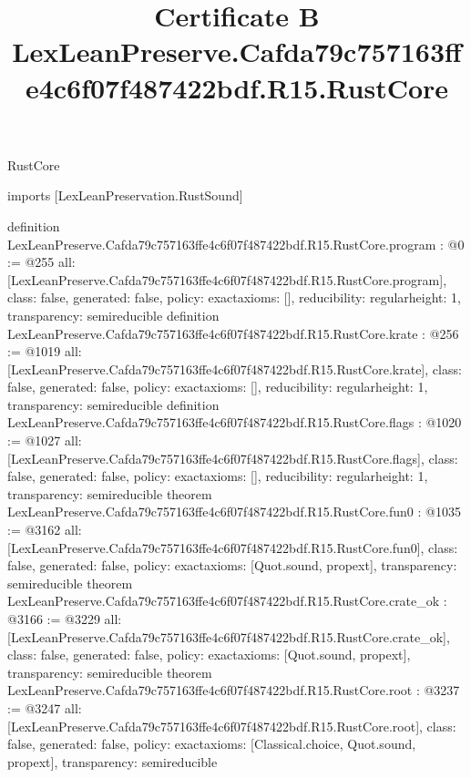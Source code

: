 \begin{lexlean}{RustCore}
\title{Certificate B LexLeanPreserve.Cafda79c757163ffe4c6f07f487422bdf.R15.RustCore}
\begin{coremodule}
imports [LexLeanPreservation.RustSound]

definition LexLeanPreserve.Cafda79c757163ffe4c6f07f487422bdf.R15.RustCore.program : @0 := @255 {
  all: [LexLeanPreserve.Cafda79c757163ffe4c6f07f487422bdf.R15.RustCore.program],
  class: false,
  generated: false,
  policy: exact{axioms: []},
  reducibility: regular{height: 1},
  transparency: semireducible
}
definition LexLeanPreserve.Cafda79c757163ffe4c6f07f487422bdf.R15.RustCore.krate : @256 := @1019 {
  all: [LexLeanPreserve.Cafda79c757163ffe4c6f07f487422bdf.R15.RustCore.krate],
  class: false,
  generated: false,
  policy: exact{axioms: []},
  reducibility: regular{height: 1},
  transparency: semireducible
}
definition LexLeanPreserve.Cafda79c757163ffe4c6f07f487422bdf.R15.RustCore.flags : @1020 := @1027 {
  all: [LexLeanPreserve.Cafda79c757163ffe4c6f07f487422bdf.R15.RustCore.flags],
  class: false,
  generated: false,
  policy: exact{axioms: []},
  reducibility: regular{height: 1},
  transparency: semireducible
}
theorem LexLeanPreserve.Cafda79c757163ffe4c6f07f487422bdf.R15.RustCore.fun0 : @1035 := @3162 {
  all: [LexLeanPreserve.Cafda79c757163ffe4c6f07f487422bdf.R15.RustCore.fun0],
  class: false,
  generated: false,
  policy: exact{axioms: [Quot.sound, propext]},
  transparency: semireducible
}
theorem LexLeanPreserve.Cafda79c757163ffe4c6f07f487422bdf.R15.RustCore.crate_ok : @3166 := @3229 {
  all: [LexLeanPreserve.Cafda79c757163ffe4c6f07f487422bdf.R15.RustCore.crate_ok],
  class: false,
  generated: false,
  policy: exact{axioms: [Quot.sound, propext]},
  transparency: semireducible
}
theorem LexLeanPreserve.Cafda79c757163ffe4c6f07f487422bdf.R15.RustCore.root : @3237 := @3247 {
  all: [LexLeanPreserve.Cafda79c757163ffe4c6f07f487422bdf.R15.RustCore.root],
  class: false,
  generated: false,
  policy: exact{axioms: [Classical.choice, Quot.sound, propext]},
  transparency: semireducible
}


\end{coremodule}
\end{lexlean}
